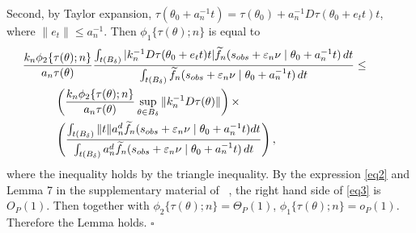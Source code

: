	Second, by Taylor expansion, $\tau(\theta_0+a_{n}^{-1}t)=\tau(\theta_0)+a_{n}^{-1}D\tau(\theta_0+e_{t}t)t$,
	where $\|e_{t}\|\leq a_{n}^{-1}$. Then $\phi_{1}\{\tau(\theta);n\}$ is equal to
	\begin{eqnarray}
    &\hspace{-1cm}\frac{k_{n}\phi_{2}\{\tau(\theta);n\}}{a_{n}\tau(\theta)}\frac{\int_{t(B_{\delta})}|k_{n}^{-1}D\tau(\theta_0+e_{t}t)t|\ftil_{n}(s_{{\rm obs}}+\veps_{n}\nu\mid\theta_0+a_{n}^{-1}t)\,dt}{\int_{t(B_{\delta})}\ftil_{n}(s_{{\rm obs}}+\veps_{n}\nu\mid\theta_0+a_{n}^{-1}t)\,dt} \leq  \nonumber \\
	&\left( \frac{k_{n}\phi_{2}\{\tau(\theta);n\}}{a_{n}\tau(\theta)}\sup_{\theta\in B_{\delta}}\|k_{n}^{-1}D\tau(\theta)\| \right) \times \\
	&\left(\frac{\int_{t(B_{\delta})}\|t\|a_{n}^{d}\ftil_{n}(s_{{\rm obs}}+\veps_{n}\nu\mid\theta_0+a_{n}^{-1}t)dt}{\int_{t(B_{\delta})}a_{n}^{d}\ftil_{n}(s_{{\rm obs}}+\veps_{n}\nu\mid\theta_0+a_{n}^{-1}t)\,dt}\right),\label{eq3}
	\end{eqnarray}
	where the inequality holds by the triangle inequality. By the expression
	\eqref{eq2} and Lemma 7 in the supplementary material of ~\cite{Li2016},
	the right hand side of \eqref{eq3} is $O_{P}(1)$. Then together
	with $\phi_{2}\{\tau(\theta);n\}=\Theta_{P}(1)$, $\phi_{1}\{\tau(\theta);n\}=o_{P}(1).$
	Therefore the Lemma holds.
	\hfill{$\square$} 
 
